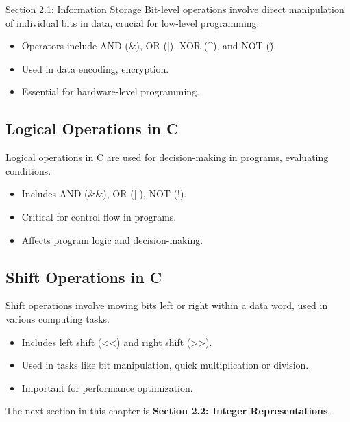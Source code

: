 \begin{notes}{Section 2.1: Information Storage}
    Bit-level operations involve direct manipulation of individual bits in data, crucial for low-level programming.

    \begin{itemize}
        \item Operators include AND (\&), OR (|), XOR (\textasciicircum), and NOT (\~).
        \item Used in data encoding, encryption.
        \item Essential for hardware-level programming.
    \end{itemize}
    
    \subsection*{Logical Operations in C}

    Logical operations in C are used for decision-making in programs, evaluating conditions.

    \begin{itemize}
        \item Includes AND (\&\&), OR (||), NOT (!).
        \item Critical for control flow in programs.
        \item Affects program logic and decision-making.
    \end{itemize}
    
    \subsection*{Shift Operations in C}

    Shift operations involve moving bits left or right within a data word, used in various computing tasks.

    \begin{itemize}
        \item Includes left shift (<<) and right shift (>>).
        \item Used in tasks like bit manipulation, quick multiplication or division.
        \item Important for performance optimization.
    \end{itemize}    
\end{notes}

The next section in this chapter is \textbf{Section 2.2: Integer Representations}.

